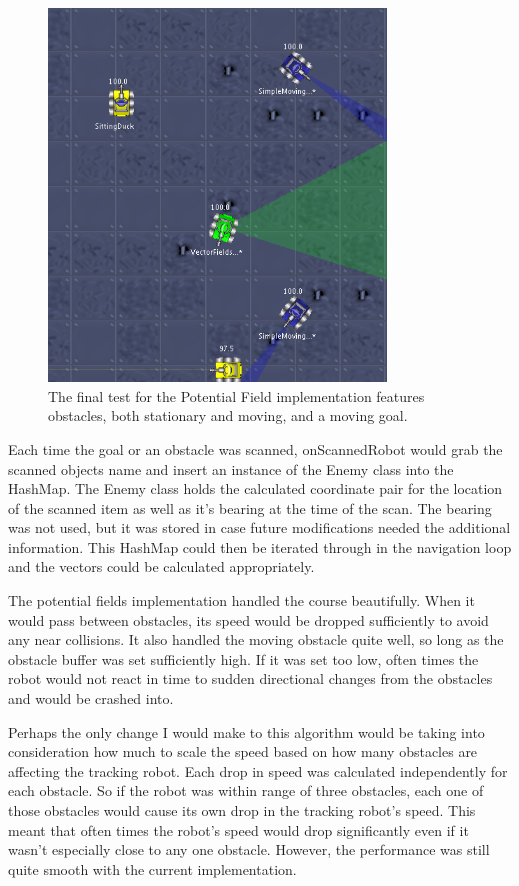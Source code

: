 \documentclass{aiaa-tc}%
\begin{document}
\begin{figure}[htb]
\centering
\includegraphics[width=0.8\textwidth]{images/FinalRun}
\caption{The final test for the Potential Field implementation features obstacles, both stationary and moving, and a moving goal.}
\label{Radar Lock Example}
\end{figure}

Each time the goal or an obstacle was scanned, onScannedRobot would grab the scanned objects name and insert an instance of the Enemy class into the HashMap. The Enemy class holds the calculated coordinate pair for the location of the scanned item as well as it's bearing at the time of the scan. The bearing was not used, but it was stored in case future modifications needed the additional information. This HashMap could then be iterated through in the navigation loop and the vectors could be calculated appropriately.

The potential fields implementation handled the course beautifully. When it would pass between obstacles, its speed would be dropped sufficiently to avoid any near collisions. It also handled the moving obstacle quite well, so long as the obstacle buffer was set sufficiently high. If it was set too low, often times the robot would not react in time to sudden directional changes from the obstacles and would be crashed into. 

Perhaps the only change I would make to this algorithm would be taking into consideration how much to scale the speed based on how many obstacles are affecting the tracking robot. Each drop in speed was calculated independently for each obstacle. So if the robot was within range of three obstacles, each one of those obstacles would cause its own drop in the tracking robot's speed. This meant that often times the robot's speed would drop significantly even if it wasn't especially close to any one obstacle. However, the performance was still quite smooth with the current implementation.
\end{document}
